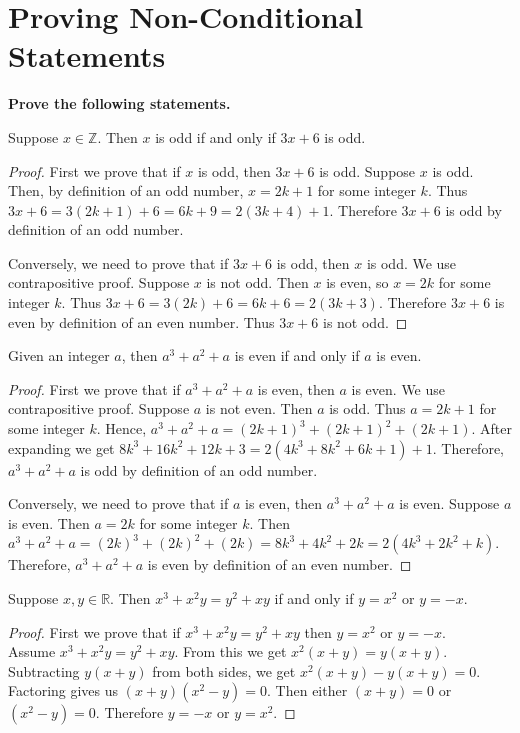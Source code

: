\documentclass[DIN, pagenumber=false, fontsize=11pt, parskip=half]{scrartcl}
\title{}
\author{} %
\date{}
\begin{document}
\maketitle

\setcounter{section}{6}

\section{Proving Non-Conditional Statements}

\textbf{Prove the following statements.}

\begin{problems}
    \problem Suppose $x \in \mathbb{Z}$. Then $x$ is odd if and only if $3x+6$ is odd.
    \begin{proof}
        First we prove that if $x$ is odd, then $3x+6$ is odd.
        Suppose $x$ is odd. 
        Then, by definition of an odd number, $x = 2k+1$ for some integer $k$.
        Thus $3x+6 = 3(2k+1)+6 = 6k+9 = 2(3k+4) + 1$. 
        Therefore $3x+6$ is odd by definition of an odd number.

        Conversely, we need to prove that if $3x+6$ is odd, then $x$ is odd.
        We use contrapositive proof. 
        Suppose $x$ is not odd. Then $x$ is even, so $x = 2k$ for some integer $k$.
        Thus $3x+6 = 3(2k)+6 = 6k+6 = 2(3k+3)$. Therefore $3x+6$ is even by definition of an even number. Thus $3x+6$ is not odd.
    \end{proof}

    \problem Given an integer $a$, then $a^3+a^2+a$ is even if and only if $a$ is even.
    \begin{proof}
        First we prove that if $a^3+a^2+a$ is even, then $a$ is even.
        We use contrapositive proof.
        Suppose $a$ is not even. Then $a$ is odd.
        Thus $a = 2k + 1$ for some integer $k$.
        Hence, $a^3 + a^2 + a = (2k+1)^3 + (2k+1)^2 + (2k + 1)$.
        After expanding we get $8k^3 + 16k^2 + 12k + 3 = 2(4k^3+8k^2+6k+1) + 1$.
        Therefore, $a^3+a^2+a$ is odd by definition of an odd number.

        Conversely, we need to prove that if $a$ is even, then $a^3+a^2+a$ is even.
        Suppose $a$ is even.
        Then $a = 2k$ for some integer $k$.
        Then $a^3+a^2+a = (2k)^3+(2k)^2+(2k) = 8k^3+4k^2+2k = 2(4k^3+2k^2+k)$.
        Therefore, $a^3+a^2+a$ is even by definition of an even number.
    \end{proof}

    \problem Suppose $x,y \in \mathbb{R}$. Then $x^3+x^2y=y^2+xy$ if and only if $y = x^2$ or $y = -x$.
    \begin{proof}
        First we prove that if $x^3+x^2y=y^2+xy$ then $y = x^2$ or $y = -x$.\\
        Assume $x^3+x^2y=y^2+xy$.
        From this we get $x^2(x+y) = y(x+y)$.
        Subtracting $y(x+y)$ from both sides, we get $x^2(x+y) - y(x+y) = 0$.
        Factoring gives us $(x+y)(x^2-y) = 0$.
        Then either $(x+y)=0$ or $(x^2-y)=0$.
        Therefore $y = -x$ or $y = x^2$.


\end{proof}
\end{problems}
\end{document}
